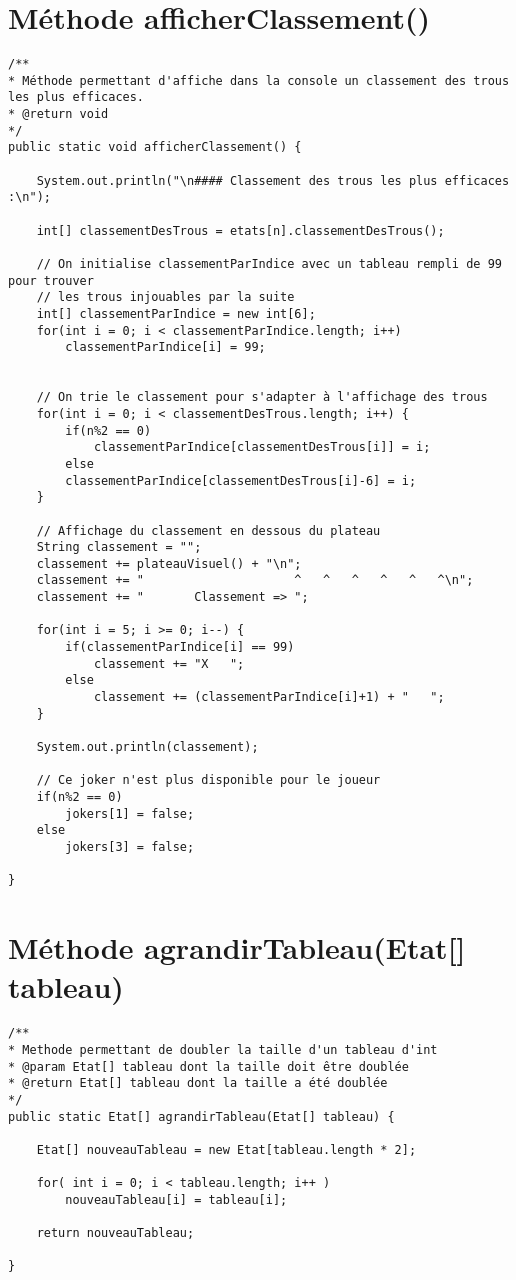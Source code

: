 \documentclass[11pt,a4paper]{report}
\begin{document}
    \section{Méthode afficherClassement()}
        \begin{lstlisting}
/**
* Méthode permettant d'affiche dans la console un classement des trous les plus efficaces.
* @return void
*/
public static void afficherClassement() {

    System.out.println("\n#### Classement des trous les plus efficaces :\n");

    int[] classementDesTrous = etats[n].classementDesTrous();

    // On initialise classementParIndice avec un tableau rempli de 99 pour trouver
    // les trous injouables par la suite
    int[] classementParIndice = new int[6];
    for(int i = 0; i < classementParIndice.length; i++)
        classementParIndice[i] = 99;


    // On trie le classement pour s'adapter à l'affichage des trous
    for(int i = 0; i < classementDesTrous.length; i++) {
        if(n%2 == 0)
            classementParIndice[classementDesTrous[i]] = i;
        else
        classementParIndice[classementDesTrous[i]-6] = i;
    }

    // Affichage du classement en dessous du plateau
    String classement = "";
    classement += plateauVisuel() + "\n";
    classement += "                     ^   ^   ^   ^   ^   ^\n";
    classement += "       Classement => ";

    for(int i = 5; i >= 0; i--) {
        if(classementParIndice[i] == 99)
            classement += "X   ";
        else
            classement += (classementParIndice[i]+1) + "   ";
    }

    System.out.println(classement);

    // Ce joker n'est plus disponible pour le joueur
    if(n%2 == 0)
        jokers[1] = false;
    else
        jokers[3] = false;

}
        \end{lstlisting}

        \newpage

    \section{Méthode agrandirTableau(Etat[] tableau)}
        \begin{lstlisting}
/**
* Methode permettant de doubler la taille d'un tableau d'int
* @param Etat[] tableau dont la taille doit être doublée
* @return Etat[] tableau dont la taille a été doublée
*/
public static Etat[] agrandirTableau(Etat[] tableau) {

    Etat[] nouveauTableau = new Etat[tableau.length * 2];

    for( int i = 0; i < tableau.length; i++ )
        nouveauTableau[i] = tableau[i];

    return nouveauTableau;

}
        \end{lstlisting}
\end{document}
